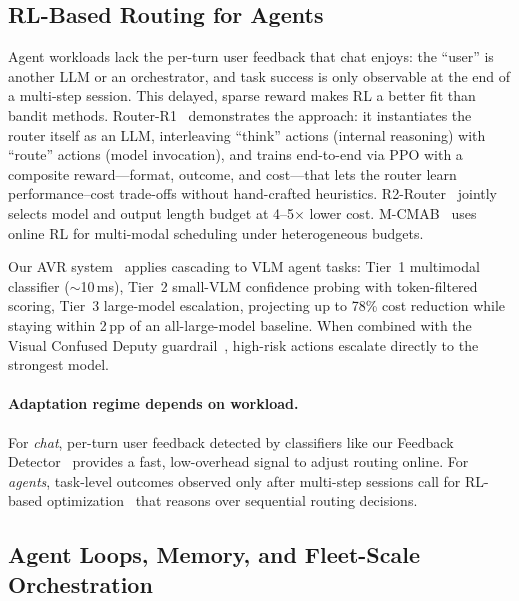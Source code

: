 \subsection{RL-Based Routing for Agents}
\label{sec:router:rl}

Agent workloads lack the per-turn user feedback that chat enjoys:
the ``user'' is another LLM or an orchestrator, and task success is
only observable at the end of a multi-step session.  This delayed,
sparse reward makes RL a better fit than bandit methods.
Router-R1~\cite{routerr1_2025} demonstrates the approach: it
instantiates the router itself as an LLM, interleaving ``think''
actions (internal reasoning) with ``route'' actions (model
invocation), and trains end-to-end via PPO with a composite
reward---format, outcome, and cost---that lets the router learn
performance--cost trade-offs without hand-crafted heuristics.
R2-Router~\cite{r2router2026} jointly selects model and output
length budget at 4--5$\times$ lower cost.
M-CMAB~\cite{mcmab2026} uses online RL for multi-modal scheduling
under heterogeneous budgets.

Our AVR system~\cite{avr2026} applies cascading to VLM agent tasks:
Tier~1 multimodal classifier ($\sim$10\,ms), Tier~2 small-VLM
confidence probing with token-filtered scoring, Tier~3 large-model
escalation, projecting up to 78\% cost reduction while staying
within 2\,pp of an all-large-model baseline.  When combined with the
Visual Confused Deputy guardrail~\cite{vcd2026}, high-risk actions
escalate directly to the strongest model.

\paragraph{Adaptation regime depends on workload.}
For \emph{chat}, per-turn user feedback detected by classifiers like
our Feedback Detector~\cite{feedbackdet2026} provides a fast,
low-overhead signal to adjust routing online.  For \emph{agents},
task-level outcomes observed only after multi-step sessions call for
RL-based optimization~\cite{routerr1_2025} that reasons over
sequential routing decisions.


\subsection{Agent Loops, Memory, and Fleet-Scale Orchestration}
\label{sec:router:agent-loops}

